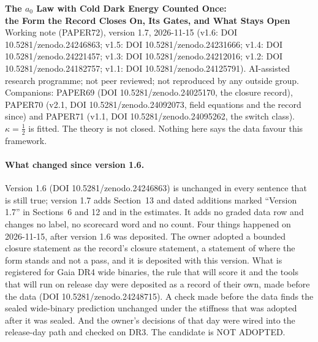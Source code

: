 \documentclass[10pt]{article}
\begin{document}
\begin{center}
{\Large\bfseries The $a_0$ Law with Cold Dark Energy Counted Once:\\ the Form the Record Closes On, Its Gates, and What Stays Open}\\[6pt]
{\small Working note (PAPER72), version 1.7, 2026-11-15 (v1.6: DOI 10.5281/zenodo.24246863; v1.5: DOI 10.5281/zenodo.24231666; v1.4: DOI 10.5281/zenodo.24221457; v1.3: DOI 10.5281/zenodo.24212016; v1.2: DOI 10.5281/zenodo.24182757; v1.1: DOI 10.5281/zenodo.24125791). AI-assisted research programme; not peer reviewed; not reproduced by any outside group.
Companions: PAPER69 (DOI 10.5281/zenodo.24025170, the closure record), PAPER70 (v2.1, DOI 10.5281/zenodo.24092073, field equations and the record since) and PAPER71 (v1.1, DOI 10.5281/zenodo.24095262, the switch class).
$\kappa=\tfrac12$ is fitted. The theory is not closed. Nothing here says the data favour this framework.}
\end{center}

\paragraph{What changed since version 1.6.} Version 1.6 (DOI 10.5281/zenodo.24246863) is unchanged in every sentence that is still true; version 1.7 adds Section~13 and dated additions marked ``Version 1.7'' in Sections~6 and 12 and in the estimates. It adds no graded data row and changes no label, no scorecard word and no count. Four things happened on 2026-11-15, after version 1.6 was deposited. The owner adopted a bounded closure statement as the record's closure statement, a statement of where the form stands and not a pass, and it is deposited with this version. What is registered for Gaia DR4 wide binaries, the rule that will score it and the tools that will run on release day were deposited as a record of their own, made before the data (DOI 10.5281/zenodo.24248715). A check made before the data finds the sealed wide-binary prediction unchanged under the stiffness that was adopted after it was sealed. And the owner's decisions of that day were wired into the release-day path and checked on DR3. The candidate is NOT ADOPTED.
\end{document}
